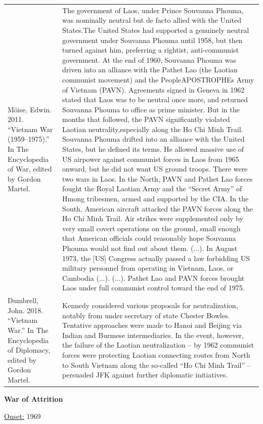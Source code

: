 {\begin{longtable}{p{}p{}}
Möise, Edwin. 2011. “Vietnam War (1959–1975).” In The Encyclopedia of War, edited by Gordon Martel. & The government of Laos, under Prince Souvanna Phouma, was nominally neutral but de facto allied with the United States.The United States had supported a genuinely neutral government under Souvanna Phouma until 1958, but then turned against him, preferring a rightist, anti-communist government. At the end of 1960, Souvanna Phouma was driven into an alliance with the Pathet Lao (the Laotian communist movement) and the PeopleAPOSTROPHEs Army of Vietnam (PAVN). Agreements signed in Geneva in 1962 stated that Laos was to be neutral once more, and returned Souvanna Phouma to office as prime minister. But in the months that followed, the PAVN significantly violated Laotian neutrality,especially along the Ho Chi Minh Trail. Souvanna Phouma drifted into an alliance with the United States, but he defined its terms. He allowed massive use of US airpower against communist forces in Laos from 1965 onward, but he did not want US ground troops.
There were two wars in Laos. In the North, PAVN and Pathet Lao forces fought the Royal Laotian Army and the “Secret Army” of Hmong tribesmen, armed and supported by the CIA. In the South, American aircraft attacked the PAVN forces along the Ho Chi Minh Trail. Air strikes were supplemented only by very small covert operations on the ground, small enough that American officials could reasonably hope Souvanna Phouma would not find out about them. (...).
In August 1973, the [US] Congress actually passed a law forbidding US military personnel from operating in Vietnam, Laos, or Cambodia (...). (...).
Pathet Lao and PAVN forces brought Laos under full communist control toward the end of 1975.

\\
Dumbrell, John. 2018. “Vietnam War.” In The Encyclopedia of Diplomacy, edited by Gordon Martel. & Kennedy considered various proposals for neutralization, notably from under secretary of state Chester Bowles. Tentative approaches were made to Hanoi and Beijing via Indian and Burmese intermediaries. In the event, however, the failure of the Laotian neutralization – by 1962 communist forces were protecting Laotian connecting routes from North to South Vietnam along the so-called “Ho Chi Minh Trail” – persuaded JFK against further diplomatic initiatives.
\\
\end{longtable}}
\clearpage
         \textbf{War of Attrition} 

          \underline{Onset:} 1969         

